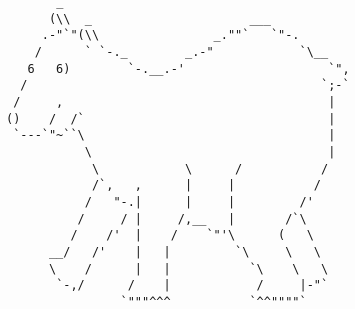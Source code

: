 \documentclass{article}
\begin{document}
\vfill
\centering
\scriptsize
\begin{BVerbatim}
       _ 
      (\\  _                      ___
     .-"`"(\\                _.""`   `"-.
    /      ` `-._        _.-"            `\__
   6   6)        `-.__.-'                    `",
  /                                         `;-`
 /     ,                                     |
()    /  /`                                  |
 `---`"~``\                                  |
           \                                 |
            \            \      /           /
            /`,   ,      |     |           /
           /   "-.|      |     |         /'
          /     / |     /,__   |       /`\
         /    /'  |    /    `"'\      (   \
      __/   /'    |   |         `\     \   \
      \    /      |   |           `\    \   \
       `-,/      /    |            /     |-"`
                `"""^^^           `^^""""`
\end{BVerbatim}
\end{document}
